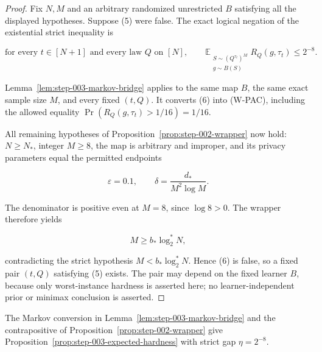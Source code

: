 \begin{proof}
Fix \(N,M\) and an arbitrary randomized unrestricted \(B\) satisfying all
the displayed hypotheses. Suppose (5) were false. The exact logical
negation of the existential strict inequality is

\[
\text{for every }t\in[N+1]\text{ and every law }Q\text{ on }[N],
\qquad
\mathbb E_{\substack{S\sim(Q^{\tau_t})^M\\g\sim B(S)}}
  R_Q(g,\tau_t)
\le2^{-8}.
\tag{6}
\]

Lemma~\ref{lem:step-003-markov-bridge} applies to the same map \(B\), the
same exact sample size \(M\), and every fixed \((t,Q)\). It converts (6) into
(W-PAC), including the allowed equality
\(\Pr(R_Q(g,\tau_t)>1/16)=1/16\).

All remaining hypotheses of Proposition~\ref{prop:step-002-wrapper} now hold:
\(N\ge N_*\), integer \(M\ge8\), the map is arbitrary and improper, and its
privacy parameters equal the permitted endpoints

\[
\varepsilon=0.1,
\qquad
\delta=\frac{d_*}{M^2\log M}.
\]

The denominator is positive even at \(M=8\), since \(\log8>0\). The wrapper therefore yields

\[
M\ge b_*\log_2^*N,
\]

contradicting the strict hypothesis \(M<b_*\log_2^*N\). Hence (6) is false,
so a fixed pair \((t,Q)\) satisfying (5) exists. The pair may depend on the
fixed learner \(B\), because only worst-instance hardness is asserted here; no
learner-independent prior or minimax conclusion is asserted. \end{proof}
The Markov conversion in Lemma~\ref{lem:step-003-markov-bridge} and the
contrapositive of Proposition~\ref{prop:step-002-wrapper} give
Proposition~\ref{prop:step-003-expected-hardness} with strict gap
$\eta=2^{-8}$.

